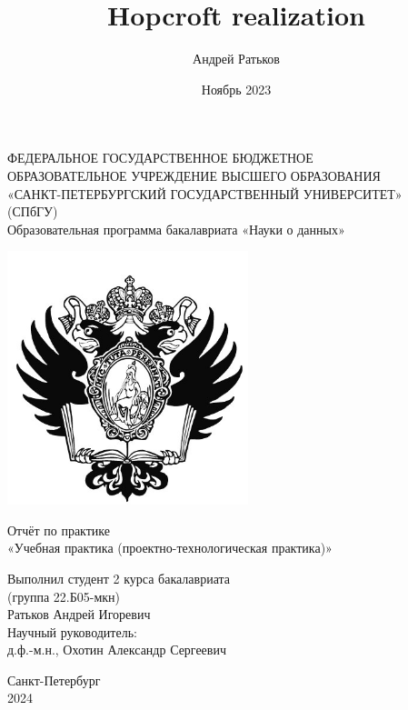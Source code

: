 \documentclass{article}
\title{Hopcroft realization}
\author{Андрей Ратьков}
\date{Ноябрь 2023}
\begin{document}
\begin{center}
  \hfill \break
  \footnotesize{ФЕДЕРАЛЬНОЕ ГОСУДАРСТВЕННОЕ БЮДЖЕТНОЕ}\\ 
  \footnotesize{ОБРАЗОВАТЕЛЬНОЕ УЧРЕЖДЕНИЕ ВЫСШЕГО ОБРАЗОВАНИЯ}\\
  \footnotesize{«САНКТ-ПЕТЕРБУРГСКИЙ ГОСУДАРСТВЕННЫЙ УНИВЕРСИТЕТ»}\\
  \footnotesize{(СПбГУ)}\\
  \hfill \break
  \normalsize{Образовательная программа бакалавриата «Науки о данных»}\\
  \hfill \break
  \hfill \break
  \begin{center}
    \includegraphics[width=7cm]{eagle.png}
  \end{center}
  \large{Отчёт по практике}\\
  \large{«Учебная практика (проектно-технологическая практика)»}\\
  \hfill\break
  \hfill \break
  \hfill \break
  \hfill \break
  \hfill \break
\end{center}
\begin{flushright}
  Выполнил студент 2 курса бакалавриата\\
  (группа 22.Б05-мкн)\\
  Ратьков Андрей Игоревич\\
  \hfill \break
  \hfill \break
  Научный руководитель:\\
  д.ф.-м.н., Охотин Александр Сергеевич\\
  \hfill \break
  \hfill \break
  \hfill \break
  \hfill \break
\end{flushright}
\begin{center}
  \hfill \break
  \hfill \break
  \hfill \break
  \hfill \break
  \hfill \break
  Санкт-Петербург\\
  2024
\end{center}
\clearpage
\tableofcontents \newpage
\end{document}
